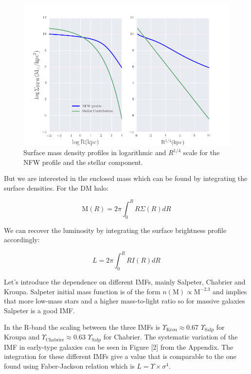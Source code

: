 \begin{figure}[]
\centering
\includegraphics[width=12cm]{images/Surface_mass_density_log.png}
\caption[Surface mass density profiles]{Surface mass density profiles in logarithmic and $R^{1/4}$ scale for the NFW profile and the stellar component.}
\end{figure}

But we are interested in the enclosed mass which can be found by integrating the surface densities. For the DM halo:

\begin{equation}
\textrm{M}(R)=2\pi \int_{0}^{R} R\Sigma(R)dR
\end{equation}

We can recover the luminosity by integrating the surface brightness profile accordingly:

\begin{equation}
L=2\pi \int_{0}^{R} RI(R)dR
\end{equation}

Let's introduce the dependence on different IMFs, mainly Salpeter, Chabrier and Kroupa. Salpeter initial mass function is of the form $n(\textrm{M})\propto \textrm{M}^{-2.3}$ and implies that more low-mass stars and a higher mass-to-light ratio so for massive galaxies  Salpeter is a good IMF. 

In the R-band the scaling between the three IMFs is $\Upsilon_{\text{Krou}}\approx 0.67$ $\Upsilon_{\text{Salp}}$ for Kroupa and $\Upsilon_{\text{Chabrier}}\approx 0.63$ $\Upsilon_{\text{Salp}}$ for Chabrier. The systematic variation of the IMF in early-type galaxies can be seen in Figure [2] from the Appendix. The integration for these different IMFs give a value that is comparable to the one found using Faber-Jackson relation which is $L=\Upsilon\times\sigma^{4}$. 

